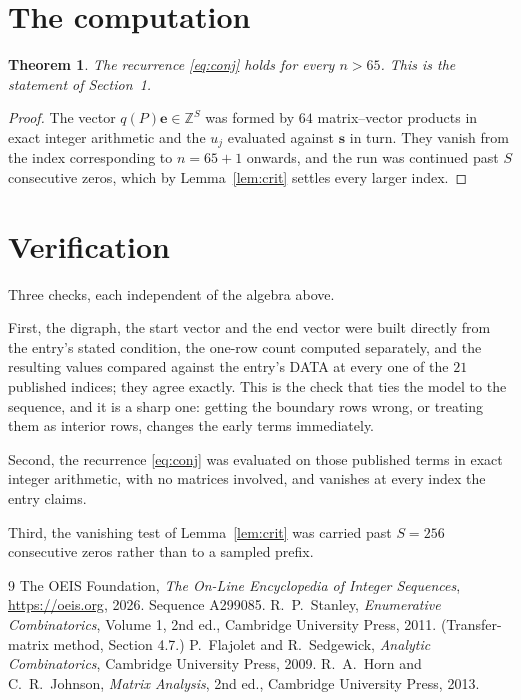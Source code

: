\documentclass[11pt,a4paper]{article}
\theoremstyle{plain}
\newtheorem{theorem}{Theorem}
\theoremstyle{definition}
\begin{document}
\section{The computation}

\begin{theorem}
The recurrence \eqref{eq:conj} holds for every $n>65$. This is the statement of
Section~1.
\end{theorem}

\begin{proof}
The vector $q(P)\mathbf{e}\in\mathbb{Z}^{S}$ was formed by $64$ matrix--vector
products in exact integer arithmetic and the $u_j$ evaluated against $\mathbf{s}$ in turn.
They vanish from the index corresponding to $n=65+1$ onwards, and the run was continued
past $S$ consecutive zeros, which by Lemma~\ref{lem:crit} settles every larger index.
\end{proof}

\section{Verification}

Three checks, each independent of the algebra above.

First, the digraph, the start vector and the end vector were built directly from the
entry's stated condition, the one-row count computed separately, and the resulting values
compared against the entry's DATA at every one of the $21$ published indices; they
agree exactly. This is the check that ties the model to the sequence, and it is a sharp one:
getting the boundary rows wrong, or treating them as interior rows, changes the early terms
immediately.

Second, the recurrence \eqref{eq:conj} was evaluated on those published terms in exact
integer arithmetic, with no matrices involved, and vanishes at every index the entry claims.

Third, the vanishing test of Lemma~\ref{lem:crit} was carried past $S=256$ consecutive
zeros rather than to a sampled prefix.

\begin{thebibliography}{9}
 The OEIS Foundation, \emph{The On-Line Encyclopedia of Integer
Sequences}, \url{https://oeis.org}, 2026. Sequence A299085.
 R.~P.~Stanley, \emph{Enumerative Combinatorics}, Volume 1, 2nd ed.,
Cambridge University Press, 2011. (Transfer-matrix method, Section 4.7.)
 P.~Flajolet and R.~Sedgewick, \emph{Analytic Combinatorics}, Cambridge
University Press, 2009.
 R.~A.~Horn and C.~R.~Johnson, \emph{Matrix Analysis}, 2nd ed., Cambridge
University Press, 2013.
\end{thebibliography}
\end{document}
